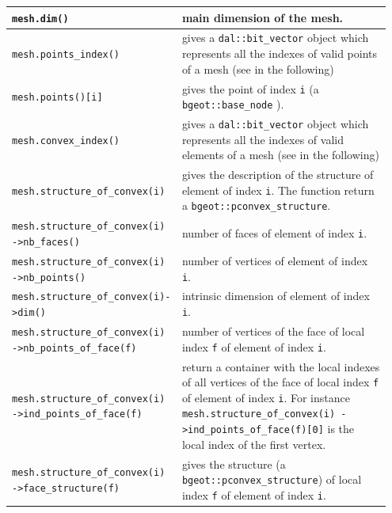 \documentclass[11pt,a4paper]{article}
\begin{document}
\begin{center} \begin{tabular}{|m{0.4\linewidth}|m{0.55\linewidth}|} \hline

  {\tt mesh.dim()} & main dimension of the mesh.  \\ \hline

  {\tt mesh.points\_index()} & gives a {\tt dal::bit\_vector} object which represents all the indexes of valid points of a mesh (see in the following)  \\ \hline

  {\tt mesh.points()[i]} & gives the point of index {\tt i} (a {\tt bgeot::base\_node} ). \\ \hline
  
  {\tt mesh.convex\_index()} & gives a {\tt dal::bit\_vector} object which represents all the indexes of valid elements of a mesh (see in the following) \\ \hline

  {\tt mesh.structure\_of\_convex(i)} & gives the description of the structure of element of index {\tt i}. The function return a {\tt bgeot::pconvex\_structure}. \\ \hline

  {\tt mesh.structure\_of\_convex(i) ->nb\_faces()} & number of faces of  element of index {\tt i}. \\ \hline

  {\tt mesh.structure\_of\_convex(i) ->nb\_points()} & number of vertices of  element of index {\tt i}. \\ \hline

  {\tt mesh.structure\_of\_convex(i)->dim()} & intrinsic dimension of element of index {\tt i}. \\ \hline

  {\tt mesh.structure\_of\_convex(i) ->nb\_points\_of\_face(f)} & number of vertices of the face of local index {\tt f} of  element of index {\tt i}.\\ \hline
 
  {\tt mesh.structure\_of\_convex(i) ->ind\_points\_of\_face(f)} & return a container with the local indexes of all vertices of the face of local index {\tt f} of  element of index {\tt i}. For instance {\tt mesh.structure\_of\_convex(i) ->ind\_points\_of\_face(f)[0]} is the local index of the first vertex. \\ \hline

  {\tt mesh.structure\_of\_convex(i) ->face\_structure(f)} & gives the structure (a {\tt bgeot::pconvex\_structure}) of local index {\tt f} of  element of index {\tt i}.\\ \hline


\end{tabular}
\end{center}
\end{document}
